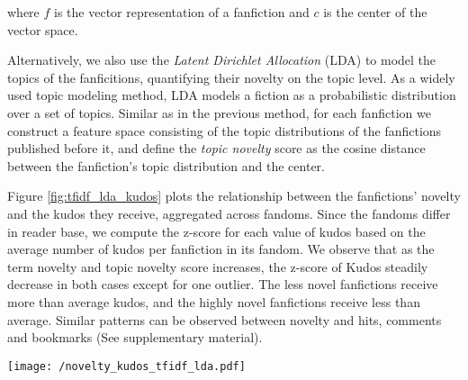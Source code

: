 \documentclass[letterpaper]{article} %
\begin{document}
where $f$ is the vector representation of a fanfiction and $c$ is the center of the vector space.

Alternatively, we also use the \emph{Latent Dirichlet Allocation} (LDA) \cite{blei2003latent} to model the topics of the fanficitions, quantifying their novelty on the topic level. As a widely used topic modeling method, LDA models a fiction as a probabilistic distribution over a set of topics. Similar as in the previous method, for each fanfiction we construct a feature space consisting of the topic distributions of the fanfictions published before it, and define the \emph{topic novelty} score as the cosine distance between the fanfiction's topic distribution and the center. 

Figure \ref{fig:tfidf_lda_kudos} plots the relationship between the fanfictions' novelty and the kudos they receive, aggregated across fandoms. Since the fandoms differ in reader base, we compute the z-score for each value of kudos based on the average number of kudos per fanfiction in its fandom. We observe that as the term novelty and topic novelty score increases, the z-score of Kudos steadily decrease in both cases except for one outlier. The less novel fanfictions receive more than average kudos, and the highly novel fanfictions receive less than average. Similar patterns can be observed between novelty and hits, comments and bookmarks (See supplementary material).

\begin{figure*}
    \centering
          \texttt{[image: /novelty\_kudos\_tfidf\_lda.pdf]}
        \caption{The relationship between novelty and kudos. Left: term novelty. Right: topic novelty. The horizontal axes are the novelty scores, and the vertical axes are the corresponding average of the z-score of kudos in bins with bin size = 0.1. The confidence intervals obtained from bootstrap resampling are shown. }
        \label{fig:tfidf_lda_kudos}
\end{figure*}
\end{document}

